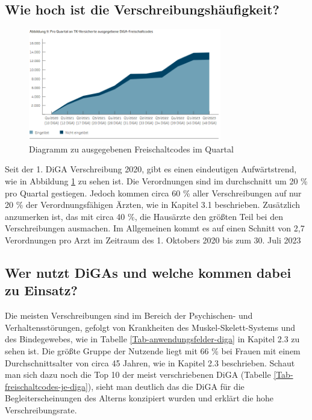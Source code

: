 \documentclass{article}
\begin{document}
		\subsection{Wie hoch ist die Verschreibungshäufigkeit?}
			\begin{figure}[htbp]
				\centering
				\includegraphics[width=0.75\textwidth]{./grafiken/abbildung-verschreibungstrend}
				\caption[Ausgegebene Freischaltcodes im Quartal]{Diagramm zu ausgegebenen Freischaltcodes im Quartal}
				\label{Abb-verschreibungstrend}
			\end{figure}
			Seit der 1. DiGA Verschreibung 2020, gibt es einen eindeutigen Aufwärtstrend, wie in Abbildung \ref{Abb-verschreibungstrend} zu sehen ist. Die Verordnungen sind im durchschnitt um 20 \% pro Quartal gestiegen. Jedoch kommen circa 60 \% aller Verschreibungen auf nur 20 \% der Verordnungsfähigen Ärzten, wie in Kapitel 3.1 beschrieben. Zusätzlich anzumerken ist, das mit circa 40 \%, die Hausärzte den größten Teil bei den Verschreibungen ausmachen. Im Allgemeinen kommt es auf einen Schnitt von 2,7 Verordnungen pro Arzt im Zeitraum des 1. Oktobers 2020 bis zum 30. Juli 2023   
		\subsection{Wer nutzt DiGAs und welche kommen dabei zu Einsatz?}
			Die meisten Verschreibungen sind im Bereich der Psychischen- und Verhaltensstörungen, gefolgt von Krankheiten des Muskel-Skelett-Systems und des Bindegewebes, wie in Tabelle \ref{Tab-anwendungsfelder-diga} in Kapitel 2.3 zu sehen ist. Die größte Gruppe der Nutzende liegt mit 66 \% bei Frauen mit einem Durchschnittsalter von circa 45 Jahren, wie in Kapitel 2.3 beschrieben. Schaut man sich dazu noch die Top 10 der meist verschriebenen DiGA (Tabelle \ref{Tab-freischaltcodes-je-diga}), sieht man deutlich das die DiGA für die Begleiterscheinungen des Alterns konzipiert wurden und erklärt die hohe Verschreibungsrate.                       
\end{document}
